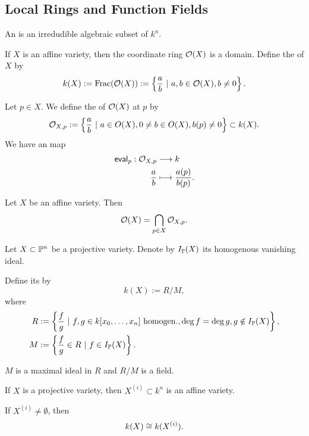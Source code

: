 \subsection{Local Rings and Function Fields}
\begin{definition}
	An  is an irredudible algebraic subset of $k^n$.
\end{definition}
\begin{definition}
If $X$ is an affine variety, then the coordinate ring $\O(X)$ is a domain. Define the  of $X$ by
\[ k(X) := \Frac(\O(X)) := \set{\frac{a}{b}}{a,b \in \O(X), b \neq 0}. \]
\end{definition}

\begin{definition}
	Let $p \in X$. We define the  of $\O(X)$ at $p$ by
	\[ \O_{X,p} := \set{\frac{a}{b}}{a\in O(X), 0\neq b \in O(X), b(p)\neq 0}\subset k(X). \]
	We have an  map
	\begin{align*}
	\textsf{eval}_p : \O_{X,p} & \Pfeil{} k\\
	\frac{a}{b} & \longmapsto \frac{a(p)}{b(p)}.
	\end{align*}
\end{definition}
\begin{lemma}
	Let $X$ be an affine variety. Then
	\[ \O(X) = \bigcap_{p\in X}\O_{X,p}. \]
\end{lemma}

\begin{definition}
	Let $X\subset \P^n$ be a projective variety. Denote by $I_{\P}(X)$ its homogenous vanishing ideal.
	
	 Define its  by
	\[ k(X) := R / M, \]
	where
	\begin{align*}
	R &:= \set{\frac{f}{g}}{f,g \in k[x_0,\ldots, x_n] \text{ homogen.}, \deg f = \deg g, g\notin I_{\P}(X) },\\
	M &:=\set{ \frac{f}{g} \in R }{f \in I_\P(X)}.	
	\end{align*}
\end{definition}
\begin{lemma}
	$M$ is a maximal ideal in $R$ and $R/M$ is a field.
\end{lemma}
\begin{lemma}
If $X$ is a projective variety, then $X^{(i)} \subset k^n$ is an affine variety.

If $X^{(i)} \neq \emptyset$, then
\[ k(X) \isom{} k(X^{(i)}).\]
\end{lemma}

